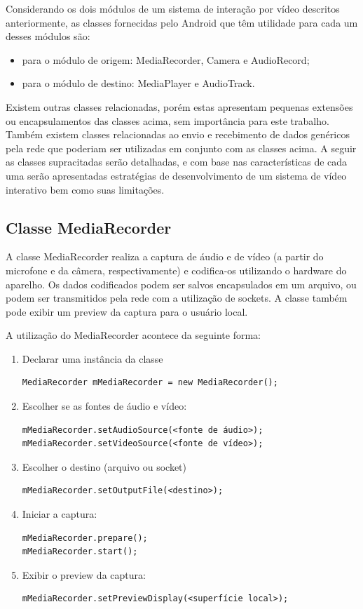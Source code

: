 \documentclass{acm_proc_article-sp}
\begin{document}
Considerando os dois módulos de um sistema de interação por vídeo descritos anteriormente, as classes fornecidas pelo Android que têm utilidade para cada um desses módulos são:
\begin{itemize}
 \item para o módulo de origem: MediaRecorder, Camera e AudioRecord;
 \item para o módulo de destino: MediaPlayer e AudioTrack.
\end{itemize}

Existem outras classes relacionadas, porém estas apresentam pequenas extensões ou encapsulamentos das classes acima, sem importância para este trabalho. Também existem classes relacionadas ao envio e recebimento de dados genéricos pela rede que poderiam ser utilizadas em conjunto com as classes acima. A seguir as classes supracitadas serão detalhadas, e com base nas características de cada uma serão apresentadas estratégias de desenvolvimento de um sistema de vídeo interativo bem como suas limitações.

\subsection{Classe MediaRecorder}
A classe MediaRecorder realiza a captura de áudio e de vídeo (a partir do microfone e da câmera, respectivamente) e codifica-os utilizando o hardware do aparelho. Os dados codificados podem ser salvos encapsulados em um arquivo, ou podem ser transmitidos pela rede com a utilização de sockets. A classe também pode exibir um preview da captura para o usuário local.

A utilização do MediaRecorder acontece da seguinte forma:
\begin{enumerate}
 \item Declarar uma instância da classe
  \begin{verbatim}
MediaRecorder mMediaRecorder = new MediaRecorder();
  \end{verbatim}
 \item Escolher se as fontes de áudio e vídeo:
  \begin{verbatim}
mMediaRecorder.setAudioSource(<fonte de áudio>);
mMediaRecorder.setVideoSource(<fonte de vídeo>);
  \end{verbatim}
 \item Escolher o destino (arquivo ou socket)
  \begin{verbatim}
mMediaRecorder.setOutputFile(<destino>);
  \end{verbatim}
 \item Iniciar a captura:
  \begin{verbatim}
mMediaRecorder.prepare();
mMediaRecorder.start();
  \end{verbatim}
 \item Exibir o preview da captura:
  \begin{verbatim}
mMediaRecorder.setPreviewDisplay(<superfície local>);
  \end{verbatim}
\end{enumerate}
\end{document}
